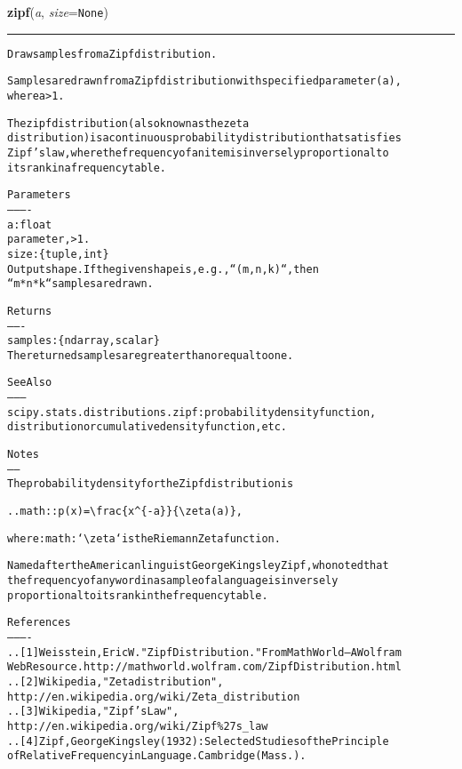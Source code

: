 \hspace{.8\funcindent}\begin{boxedminipage}{\funcwidth}

    \raggedright \textbf{zipf}(\textit{a}, \textit{size}={\tt None})

    \vspace{-1.5ex}

    \rule{\textwidth}{0.5\fboxrule}
\setlength{\parskip}{2ex}
\begin{alltt}
Draw samples from a Zipf distribution.

Samples are drawn from a Zipf distribution with specified parameter (a),
where a {\textgreater} 1.

The zipf distribution (also known as the zeta
distribution) is a continuous probability distribution that satisfies
Zipf's law, where the frequency of an item is inversely proportional to
its rank in a frequency table.

Parameters
----------
a : float
    parameter, {\textgreater} 1.
size : \{tuple, int\}
    Output shape.  If the given shape is, e.g., ``(m, n, k)``, then
    ``m * n * k`` samples are drawn.

Returns
-------
samples : \{ndarray, scalar\}
    The returned samples are greater than or equal to one.

See Also
--------
scipy.stats.distributions.zipf : probability density function,
    distribution or cumulative density function, etc.

Notes
-----
The probability density for the Zipf distribution is

.. math:: p(x) = {\textbackslash}frac\{x{\textasciicircum}\{-a\}\}\{{\textbackslash}zeta(a)\},

where :math:`{\textbackslash}zeta` is the Riemann Zeta function.

Named after the American linguist George Kingsley Zipf, who noted that
the frequency of any word in a sample of a language is inversely
proportional to its rank in the frequency table.


References
----------
.. [1] Weisstein, Eric W. "Zipf Distribution." From MathWorld--A Wolfram
       Web Resource. http://mathworld.wolfram.com/ZipfDistribution.html
.. [2] Wikipedia, "Zeta distribution",
       http://en.wikipedia.org/wiki/Zeta\_distribution
.. [3] Wikipedia, "Zipf's Law",
       http://en.wikipedia.org/wiki/Zipf\%27s\_law
.. [4] Zipf, George Kingsley (1932): Selected Studies of the Principle
       of Relative Frequency in Language. Cambridge (Mass.).


\end{alltt}
\end{boxedminipage}
